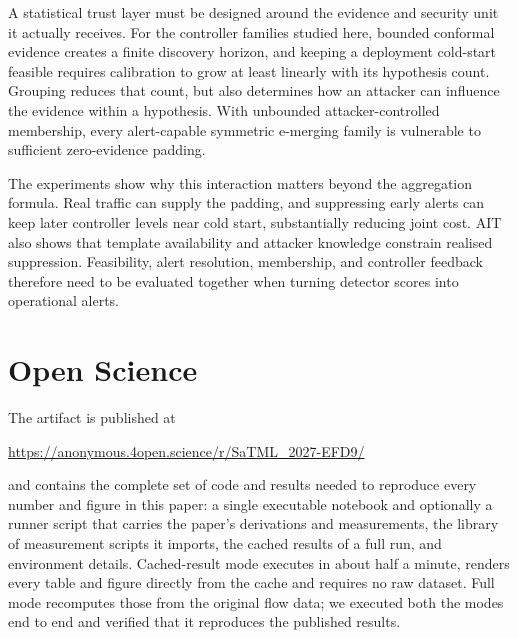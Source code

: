 \documentclass[conference]{IEEEtran}
\begin{document}
A statistical trust layer must be designed around the evidence and security unit it actually
receives. For the controller families studied here, bounded conformal evidence creates a finite
discovery horizon, and keeping a deployment cold-start feasible requires calibration to grow at
least linearly with its hypothesis count. Grouping reduces that count, but also determines how an
attacker can influence the evidence within a hypothesis. With unbounded attacker-controlled
membership, every alert-capable symmetric e-merging family is vulnerable to sufficient
zero-evidence padding.

The experiments show why this interaction matters beyond the aggregation formula. Real traffic
can supply the padding, and suppressing early alerts can keep later controller levels near cold
start, substantially reducing joint cost. AIT also shows that template availability and attacker
knowledge constrain realised suppression. Feasibility, alert resolution, membership, and controller
feedback therefore need to be evaluated together when turning detector scores into operational
alerts.


\section*{Open Science}\label{sec:openscience}

The artifact is published at
\begin{center}
\small\url{https://anonymous.4open.science/r/SaTML_2027-EFD9/}
\end{center}
and contains the complete set of code and results needed to reproduce every number and figure in this
paper: a single executable notebook and optionally a runner script that carries the paper's derivations
and measurements, the library of measurement scripts it imports, the cached results of a full run, and
environment details. Cached-result mode executes in
about half a minute, renders every table and figure directly from the cache and requires no raw dataset. Full mode recomputes those from the original flow data; we
executed both the modes end to end and verified that it reproduces the published results.
\end{document}
